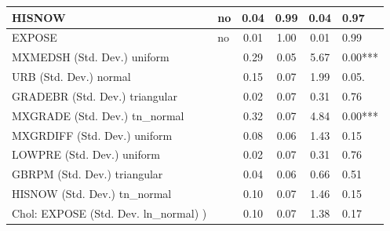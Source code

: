 \begin{table}
\begin{center}
\begin{tabular}{|l|l|c|c|c|l|}
			\hline
			HISNOW & no & 0.04 & 0.99 & 0.04 & 0.97 \\
			\hline
			EXPOSE & no & 0.01 & 1.00 & 0.01 & 0.99 \\
			\hline
			MXMEDSH (Std. Dev.) uniform &  & 0.29 & 0.05 & 5.67 & 0.00*** \\
			\hline
			URB (Std. Dev.) normal &  & 0.15 & 0.07 & 1.99 & 0.05. \\
			\hline
			GRADEBR (Std. Dev.) triangular &  & 0.02 & 0.07 & 0.31 & 0.76 \\
			\hline
			MXGRADE (Std. Dev.) tn_normal &  & 0.32 & 0.07 & 4.84 & 0.00*** \\
			\hline
			MXGRDIFF (Std. Dev.) uniform &  & 0.08 & 0.06 & 1.43 & 0.15 \\
			\hline
			LOWPRE (Std. Dev.) uniform &  & 0.02 & 0.07 & 0.31 & 0.76 \\
			\hline
			GBRPM (Std. Dev.) triangular &  & 0.04 & 0.06 & 0.66 & 0.51 \\
			\hline
			HISNOW (Std. Dev.) tn_normal &  & 0.10 & 0.07 & 1.46 & 0.15 \\
			\hline
			 Chol: EXPOSE (Std. Dev. ln_normal) ) &  & 0.10 & 0.07 & 1.38 & 0.17 \\
			\hline
		\end{tabular}
	\end{center}
\end{table}